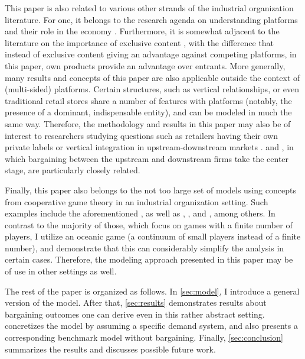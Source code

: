 \documentclass[a4paper]{article}
\begin{document}
This paper is also related to various other strands of the industrial organization literature.
For one, it belongs to the research agenda on understanding platforms and their role in the economy \parencite[e.g.][]{rochet2003platform,hagiu2004optimal,armstrong2006competition,evans2011platform,lee2014competing}.
Furthermore, it is somewhat adjacent to the literature on the importance of exclusive content \parencite[e.g.][]{hagiu2011exclusivity,lee2013vertical,dou2014sell,weeds2016tv}, with the difference that instead of exclusive content giving an advantage against competing platforms, in this paper, own products provide an advantage over entrants.
More generally, many results and concepts of this paper are also applicable outside the context of (multi-sided) platforms.
Certain structures, such as vertical relationships, or even traditional retail stores share a number of features with platforms (notably, the presence of a dominant, indispensable entity), and can be modeled in much the same way.
Therefore, the methodology and results in this paper may also be of interest to researchers studying questions such as retailers having their own private labels \parencite{steiner2004nature} or vertical integration in upstream-downstream markets \parencite{hart1990vertical,aghion2006vertical}.
\textcite{de2005vertical} and \textcite{montez2007downstream}, in which bargaining between the upstream and downstream firms take the center stage, are particularly closely related.

Finally, this paper also belongs to the not too large set of models using concepts from cooperative game theory in an industrial organization setting.
Such examples include the aforementioned \textcite{montez2007downstream}, as well as \textcite{hart1990property}, \textcite{levy1997individual}, \textcite{inderst2003bargaining} and \textcite{brugemann2019intra}, among others.
In contrast to the majority of those, which focus on games with a finite number of players, I utilize an oceanic game (a continuum of small players instead of a finite number), and demonstrate that this can considerably simplify the analysis in certain cases.
Therefore, the modeling approach presented in this paper may be of use in other settings as well.

The rest of the paper is organized as follows.
In \cref{sec:model}, I introduce a general version of the model.
After that, \cref{sec:results} demonstrates results about bargaining outcomes one can derive even in this rather abstract setting.
 concretizes the model by assuming a specific demand system, and also presents a corresponding benchmark model without bargaining.
Finally, \cref{sec:conclusion} summarizes the results and discusses possible future work.
\end{document}
